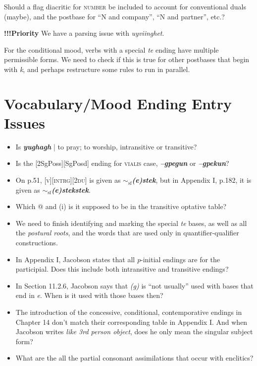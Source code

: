 \documentclass{article}
\begin{document}
\item Should a flag diacritic for \textsc{number} be included to account for conventional duals (maybe), and the postbase for ``N and company'', ``N and partner'', etc.?

\item \textbf{!!!Priority} We have a parsing issue with \textit{uyviinghet}.

\item For the conditional mood, verbs with a special \textit{te} ending have multiple permissible forms.
%
We need to check if this is true for other postbases that begin with \textit{k}, and perhaps restructure some rules to run in parallel.



\section{Vocabulary/Mood Ending Entry Issues}

\begin{itemize}
\renewcommand\labelitemi{$\cdot$}

\item Is \textit{\textbf{yughagh}} | to pray; to worship, intransitive or transitive?

\item Is the [2SgPoss][SgPosd] ending for \textsc{vialis} case, \textit{\textbf{--gpegun}} or \textit{\textbf{--gpekun}}?

\item On p.51, \textsc{[v][intrg][2du]} is given as \textit{\textbf{$\sim_\text{sf}$(e)stek}}, but in Appendix I, p.182, it is given as \textit{\textbf{$\sim_\text{sf}$(e)stekstek}}.

\item Which @ and (i) is it supposed to be in the transitive optative table?

\item We need to finish identifying and marking the special \textit{te} bases, as well as all the \textit{postural roots}, and the words that are used only in quantifier-qualifier constructions.

\item In Appendix I, Jacobson states that all \textit{p}-initial endings are for the participial.
%
Does this include both intransitive and transitive endings?

\item In Section 11.2.6, Jacobson says that \textit{(g)} is ``not usually'' used with bases that end in \textit{e}.
%
When is it used with those bases then?

\item The introduction of the concessive, conditional, contemporative endings in Chapter 14 don't match their corresponding table in Appendix I.
%
And when Jacobson writes \textit{like 3rd person object}, does he only mean the singular subject form?

\item What are the all the partial consonant assimilations that occur with enclitics?

\end{itemize}
\end{document}
